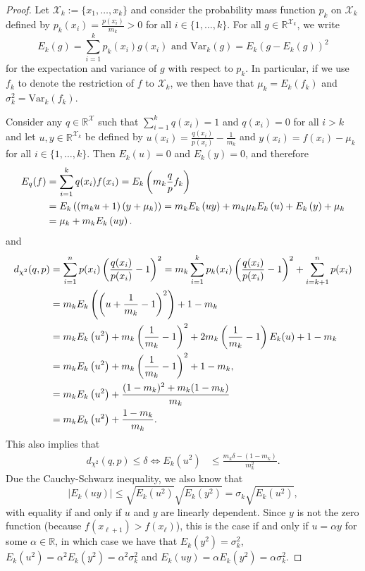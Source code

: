 \documentclass{article}
\begin{document}
\begin{proof}
Let $\mathcal{X}_k:=\{x_1,\ldots,x_k\}$ and consider the probability mass function $p_k$ on $\mathcal{X}_k$ defined by $p_k(x_i)=\frac{p(x_i)}{m_k}>0$ for all $i\in\{1,\ldots,k\}$. For all $g\in\mathbb{R}^{\mathcal{X}_k}$, we write
\begin{equation*}
E_k(g)=\sum_{i=1}^k p_k(x_i)g(x_i)
\text{ and }
\mathrm{Var}_k(g)=E_k(g-E_k(g))^2
\end{equation*}
for the expectation and variance of $g$ with respect to $p_k$. In particular, if we use $f_k$ to denote the restriction of $f$ to $\mathcal{X}_k$, we then have that $\mu_k=E_k(f_k)$ and $\sigma_k^2=\mathrm{Var}_k(f_k)$.



Consider any $q\in\mathbb{R}^\mathcal{X}$ such that $\sum_{i=1}^kq(x_i)=1$ and $q(x_i)=0$ for all $i>k$ and let $u,y\in\mathbb{R}^{\mathcal{X}_k}$ be defined by $u(x_i)=\frac{q(x_i)}{p(x_i)}-\frac{1}{m_k}$ and $y(x_i)=f(x_i)-\mu_k$ for all $i\in\{1,\ldots,k\}$. Then $E_k(u)=0$ and $E_k(y)=0$, and therefore
\begin{align}\label{eq:expectationwithu}
E_q(f)
&=\sum_{i=1}^k q(x_i)f(x_i)
=E_k\left(m_k\frac{q}{p}f_k\right)\notag\\
&=E_k\left(\left(m_ku+1\right)(y+\mu_k)\right)=m_kE_k\left(u y\right)+m_k\mu_k E_k\left(u\right)+E_k\left(y\right)+\mu_k\notag\\
&=\mu_k+m_kE_k\left(u y\right).
\end{align}
and
\begin{align}\label{eq:chi2divergencewithu}
d_{\chi^2}(q,p)
&=\sum_{i=1}^n p(x_i)\left(\frac{q(x_i)}{p(x_i)}-1\right)^2
=m_k\sum_{i=1}^k p_k(x_i)\left(\frac{q(x_i)}{p(x_i)}-1\right)^2+\sum_{i=k+1}^n p(x_i)\notag\\
&=m_kE_k\left(\left(u+\frac{1}{m_k}-1\right)^2\right)+1-m_k\notag\\
&=m_kE_k\left(u^2\right)+m_k\left(\frac{1}{m_k}-1\right)^2+2m_k\left(\frac{1}{m_k}-1\right)E_k(u)+1-m_k\notag\\
&=m_kE_k\left(u^2\right)+m_k\left(\frac{1}{m_k}-1\right)^2+1-m_k,\notag\\
&=m_kE_k\left(u^2\right)+\frac{(1-m_k)^2+m_k(1-m_k)}{m_k}\notag\\
&=m_kE_k\left(u^2\right)+\frac{1-m_k}{m_k}.
\end{align}
This also implies that
\begin{align}\label{eq:chi2divergenceconstraintwithu}
d_{\chi^2}(q,p)\leq\delta
\Leftrightarrow
E_k(u^2)&\leq\frac{m_k\delta-(1-m_k)}{m_k^2}.
\end{align}
Due the Cauchy-Schwarz inequality, we also know that
\begin{equation}\label{eq:cauchy-schwarz}
\vert E_k(uy)\vert
\leq\sqrt{E_k(u^2)}\sqrt{E_k(y^2)}=\sigma_k\sqrt{E_k(u^2)},
\end{equation}
with equality if and only if $u$ and $y$ are linearly dependent. Since $y$ is not the zero function (because $f(x_{\ell+1})>f(x_\ell)$), this is the case if and only if $u=\alpha y$ for some $\alpha\in\mathbb{R}$, in which case we have that $E_k(y^2)=\sigma_k^2$, $E_k(u^2)=\alpha^2E_k(y^2)=\alpha^2\sigma_k^2$ and $E_k(uy)=\alpha E_k(y^2)=\alpha\sigma_k^2$.


\end{proof}
\end{document}
